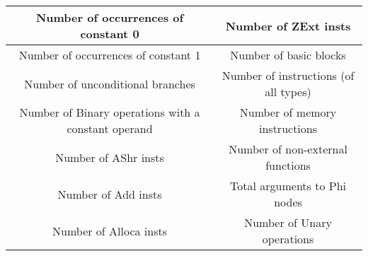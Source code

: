 \begin{table*}[!t]
\begin{tabular}{|c|c|}
Number of occurrences of constant 0 & Number of ZExt insts \\ \hline
Number of occurrences of constant 1 & Number of basic blocks \\ \hline
Number of unconditional branches & Number of instructions (of all types) \\ \hline
Number of Binary operations with a constant operand & Number of memory instructions \\ \hline
Number of AShr insts & Number of non-external functions \\ \hline
Number of Add insts & Total arguments to Phi nodes \\ \hline
Number of Alloca insts & Number of Unary operations \\ \hline
\end{tabular}
\label{tab:tab1}
\end{table*}

